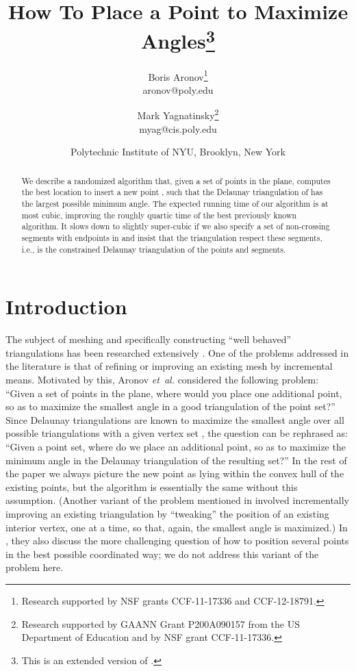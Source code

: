 \documentclass{cccg13}
\begin{document}
\title{How To Place a Point to Maximize Angles\thanks{This is an extended version of \cite{c3g}.}}
\author{
	Boris Aronov\thanks{
		Research supported by NSF grants CCF-11-17336 and CCF-12-18791.}\\
	aronov@poly.edu
	\and Mark Yagnatinsky\thanks{
		Research supported by GAANN Grant P200A090157 from the US Department of Education and by NSF grant CCF-11-17336.}\\
  myag@cis.poly.edu
}
\date{\ifcccg\normalsize\fi Polytechnic Institute of NYU, Brooklyn, New York}
\maketitle
\begin{abstract}
  We describe a randomized algorithm that, given a set  of points in the plane, computes the best location to insert a new point , such that the Delaunay triangulation of  has the largest possible minimum angle.  The expected running time of our algorithm is at most cubic, improving the roughly quartic time of the best previously known algorithm.  It slows down to slightly super-cubic if we also specify a set of non-crossing segments with endpoints in  and insist that the triangulation respect these segments, i.e., is the constrained Delaunay triangulation of the points and segments.
\end{abstract}

\section{Introduction}
The subject of meshing and specifically constructing ``well behaved'' triangulations has been researched extensively \cite{mesh}.  One of the problems addressed in the literature is that of refining or improving an existing mesh by incremental means.  Motivated by this, Aronov \emph{et~al.} \cite{orig} considered the following problem: ``Given a set of points in the plane, where would you place one additional point, so as to maximize the smallest angle in a good triangulation of the point set?''  Since Delaunay triangulations are known to maximize the smallest angle over all possible triangulations with a given vertex set \cite{Delaunay-good}, the question can be rephrased as: ``Given a point set, where do we place an additional point, so as to maximize the minimum angle in the Delaunay triangulation of the resulting set?''  In the rest of the paper we always picture the new point as lying within the convex hull of the existing points, but the algorithm is essentially the same without this assumption.  (Another variant of the problem mentioned in \cite{orig} involved incrementally improving an existing triangulation by ``tweaking'' the position of an existing interior vertex, one at a time, so that, again, the smallest angle is maximized.)  In \cite{orig}, they also discuss the more challenging question of how to position several points in the best possible coordinated way; we do not address this variant of the problem here.
\end{document}
